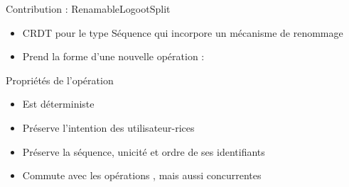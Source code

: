 \begin{frame}{Contribution : RenamableLogootSplit}
    \begin{itemize}
        \item CRDT pour le type Séquence qui incorpore un mécanisme de renommage
        \item Prend la forme d'une nouvelle opération : \ren
    \end{itemize}
    \begin{block}{Propriétés de l'opération \ren}
        \begin{itemize}
            \item Est déterministe
            \item Préserve l'intention des utilisateur-rices
            \item Préserve la séquence, \ie unicité et ordre de ses identifiants
            \item Commute avec les opérations \ins, \rmv mais aussi \ren concurrentes
        \end{itemize}
    \end{block}
\end{frame}
